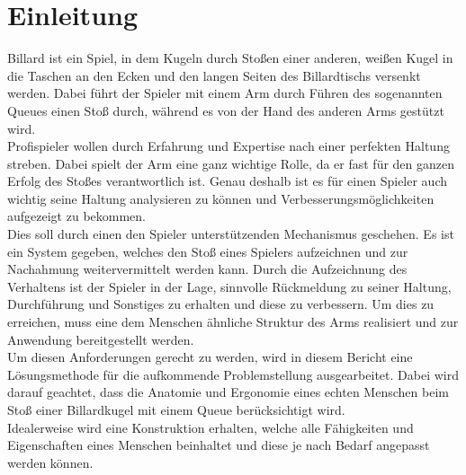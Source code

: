 \chapter{Einleitung}
	
	Billard ist ein Spiel, in dem Kugeln durch Stoßen einer anderen, weißen Kugel in die Taschen an den Ecken und den langen Seiten des Billardtischs versenkt werden. Dabei führt der Spieler mit einem Arm durch Führen des sogenannten Queues einen Stoß durch, während es von der Hand des anderen Arms gestützt wird.\\
	Profispieler wollen durch Erfahrung und Expertise nach einer perfekten Haltung streben. Dabei spielt der Arm eine ganz wichtige Rolle, da er fast für den ganzen Erfolg des Stoßes verantwortlich ist. Genau deshalb ist es für einen Spieler auch wichtig seine Haltung analysieren zu können und Verbesserungsmöglichkeiten aufgezeigt zu bekommen.\\
	Dies soll durch einen den Spieler unterstützenden Mechanismus geschehen. Es ist ein System gegeben, welches den Stoß eines Spielers aufzeichnen und zur Nachahmung weitervermittelt werden kann. Durch die Aufzeichnung des Verhaltens ist der Spieler in der Lage, sinnvolle Rückmeldung zu seiner Haltung, Durchführung und Sonstiges zu erhalten und diese zu verbessern. Um dies zu erreichen, muss eine dem Menschen ähnliche Struktur des Arms realisiert und zur Anwendung bereitgestellt werden.\\
	Um diesen Anforderungen gerecht zu werden, wird in diesem Bericht eine Lösungsmethode für die aufkommende Problemstellung ausgearbeitet. Dabei wird darauf geachtet, dass die Anatomie und Ergonomie eines echten Menschen beim Stoß einer Billardkugel mit einem Queue berücksichtigt wird.\\
	Idealerweise wird eine Konstruktion erhalten, welche alle Fähigkeiten und Eigenschaften eines Menschen beinhaltet und diese je nach Bedarf angepasst werden können.
